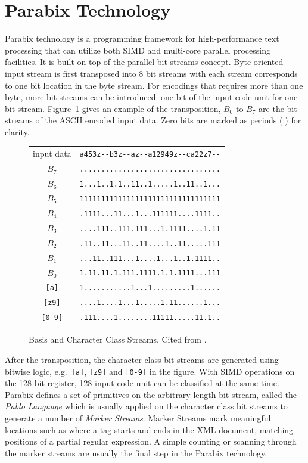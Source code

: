 \section{Parabix Technology}
Parabix technology is a programming framework for high-performance text processing that can utilize both SIMD and multi-core parallel processing facilities. It is built on top of the parallel bit streams concept. Byte-oriented input stream is first transposed into 8 bit streams with each stream corresponds to one bit location in the byte stream. For encodings that requires more than one byte, more bit streams can be introduced: one bit of the input code unit for one bit stream. Figure~\ref{figure:streams} gives an example of the transposition, $B_0$ to $B_7$ are the bit streams of the ASCII encoded input data. Zero bits are marked as periods (.) for clarity.

\begin{figure}[tbh]
\begin{center}
\begin{tabular}{cr}\\
input data  & \verb`a453z--b3z--az--a12949z--ca22z7--`\\
$B_7$ & \verb`.................................`\\
$B_6$ & \verb`1...1..1.1..11..1.....1..11..1...`\\
$B_5$ & \verb`111111111111111111111111111111111`\\
$B_4$ & \verb`.1111...11...1...111111....1111..`\\
$B_3$ & \verb`....111..111.111...1.1111....1.11`\\
$B_2$ & \verb`.11..11...11..11....1..11.....111`\\
$B_1$ & \verb`...11..111...1....1...1..1.1111..`\\
$B_0$ & \verb`1.11.11.1.111.1111.1.1.1111...111`\\
\verb:[a]: & \verb`1...........1...1.........1......`\\
\verb:[z9]: & \verb`....1....1...1.....1.11......1...`\\
\verb:[0-9]: & \verb`.111....1........11111.....11.1..`
\end{tabular}
\end{center}
\caption[Basis and Character Class Streams]{Basis and Character Class Streams. Cited from \cite{rob_regex}.}
\label{figure:streams}
\end{figure}

After the transposition, the character class bit streams are generated using bitwise logic, e.g.\ \verb:[a]:, \verb:[z9]: and \verb:[0-9]: in the figure. With SIMD operations on the 128-bit register, 128 input code unit can be classified at the same time. Parabix defines a set of primitives on the arbitrary length bit stream, called the \textit{Pablo Language} which is usually applied on the character class bit streams to generate a number of \textit{Marker Streams}. Marker Streams mark meaningful locations such as where a tag starts and ends in the XML document, matching positions of a partial regular expression. A simple counting or scanning through the marker streams are usually the final step in the Parabix technology.

